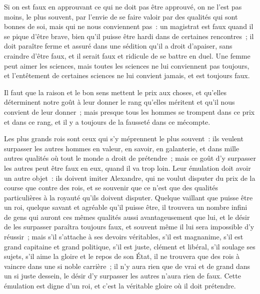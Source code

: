 \documentclass[french,twoside]{book} %
\begin{document}
Si on est faux en approuvant ce qui ne doit pas être approuvé, on ne l’est pas moins, le plus souvent, par l’envie de se faire valoir par des qualités qui sont bonnes de soi, mais qui ne nous conviennent pas : un magistrat est faux quand il se pique d’être brave, bien qu’il puisse être hardi dans de certaines rencontres ; il doit paraître ferme et assuré dans une sédition qu’il a droit d’apaiser, sans craindre d’être faux, et il serait faux et ridicule de se battre en duel. Une femme peut aimer les sciences, mais toutes les sciences ne lui conviennent pas toujours, et l’entêtement de certaines sciences ne lui convient jamais, et est toujours faux.\par
Il faut que la raison et le bon sens mettent le prix aux choses, et qu’elles déterminent notre goût à leur donner le rang qu’elles méritent et qu’il nous convient de leur donner ; mais presque tous les hommes se trompent dans ce prix et dans ce rang, et il y a toujours de la fausseté dans ce mécompte.\par
Les plus grands rois sont ceux qui s’y méprennent le plus souvent : ils veulent surpasser les autres hommes en valeur, en savoir, en galanterie, et dans mille autres qualités où tout le monde a droit de prétendre ; mais ce goût d’y surpasser les autres peut être faux en eux, quand il va trop loin. Leur émulation doit avoir un autre objet : ils doivent imiter Alexandre, qui ne voulut disputer du prix de la course que contre des rois, et se souvenir que ce n’est que des qualités particulières à la royauté qu’ils doivent disputer. Quelque vaillant que puisse être un roi, quelque savant et agréable qu’il puisse être, il trouvera un nombre infini de gens qui auront ces mêmes qualités aussi avantageusement que lui, et le désir de les surpasser paraîtra toujours faux, et souvent même il lui sera impossible d’y réussir ; mais s’il s’attache à ses devoirs véritables, s’il est magnanime, s’il est grand capitaine et grand politique, s’il est juste, clément et libéral, s’il soulage ses sujets, s’il aime la gloire et le repos de son État, il ne trouvera que des rois à vaincre dans une si noble carrière ; il n’y aura rien que de vrai et de grand dans un si juste dessein, le désir d’y surpasser les autres n’aura rien de faux. Cette émulation est digne d’un roi, et c’est la véritable gloire où il doit prétendre.
\end{document}
